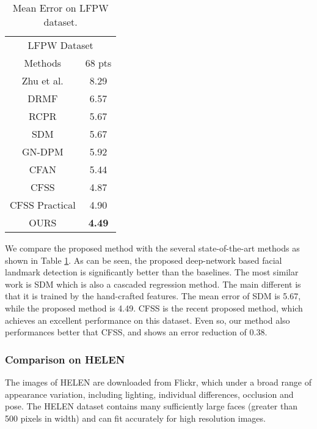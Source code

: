 \documentclass[journal]{IEEEtran}
\begin{document}
\begin{table}[h]
\small
    \centering \caption{Mean Error on LFPW dataset.}
    \begin{tabular}{c c }
        \hline
 \multicolumn{2}{c}{LFPW Dataset} \\
Methods & 68 pts \\
        \hline
 Zhu et al. & 8.29   \\

 DRMF  & 6.57 \\

 RCPR & 5.67 \\

 SDM & 5.67  \\

 GN-DPM & 5.92 \\

 CFAN & 5.44 \\

 CFSS & 4.87 \\

 CFSS Practical & 4.90   \\
 \hline

 OURS & \textbf{4.49} \\
 \hline
        \end{tabular}
    \label{lfpw}
\end{table}

We compare the proposed method with the several state-of-the-art methods as shown in Table \ref{lfpw}. As can be seen, the proposed deep-network based facial landmark detection is significantly better than the baselines. The most similar work is SDM which is also a cascaded regression method. The main different is that it is trained by the hand-crafted features. The mean error of SDM is 5.67, while the proposed method is 4.49. CFSS is the recent proposed method, which achieves an excellent performance on this dataset. Even so, our method also performances better that CFSS, and shows an error reduction of 0.38.

\subsubsection{Comparison on HELEN}
The images of HELEN are downloaded from Flickr, which under a broad range of appearance variation, including lighting, individual differences, occlusion and pose. The HELEN dataset contains many sufficiently large faces (greater than 500 pixels in width) and can fit accurately for high resolution images.
\end{document}
